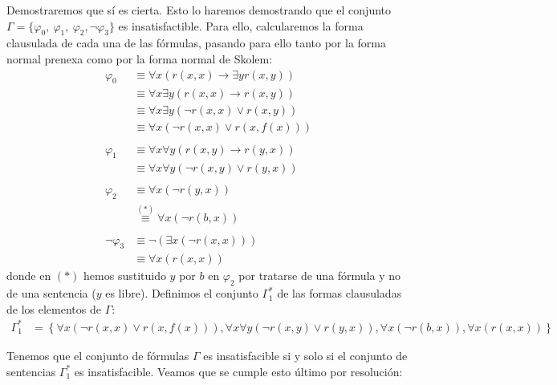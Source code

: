 \documentclass[12pt]{article}
\begin{document}
\begin{ejercicio}
\begin{enumerate}
            Demostraremos que sí es cierta. Esto lo haremos demostrando que el conjunto $\Gamma=\{\varphi_0,~\varphi_1,~\varphi_2, \lnot\varphi_3\}$ es insatisfactible.
            Para ello, calcularemos la forma clausulada de cada una de las fórmulas,
            pasando para ello tanto por la forma normal prenexa como por la forma normal de Skolem:
            \begin{align*}
                \varphi_0&\equiv \forall x (r(x, x) \rightarrow \exists y r(x, y))\\
                & \equiv \forall x \exists y (r(x, x) \rightarrow r(x, y))\\
                & \equiv \forall x \exists y (\lnot r(x, x) \lor r(x, y))\\
                & \equiv \forall x (\lnot r(x, x) \lor r(x, f(x)))\\ \\
                \varphi_1&\equiv \forall x \forall y (r(x, y) \rightarrow r(y, x))\\
                &\equiv \forall x \forall y (\lnot r(x, y) \lor r(y, x))\\ \\
                \varphi_2 &\equiv \forall x (\lnot r(y, x))\\
                &\stackrel{(\ast)}{\equiv} \forall x (\lnot r(b, x))\\ \\
                \lnot \varphi_3&\equiv \lnot (\exists x (\lnot r(x, x)))\\
                &\equiv \forall x (r(x, x))
            \end{align*}
            donde en $(\ast)$ hemos sustituido $y$ por $b$ en $\varphi_2$
            por tratarse de una fórmula y no de una sentencia ($y$ es libre).
            Definimos el conjunto $\Gamma_1^\ast$ de las formas clausuladas de los elementos de $\Gamma$:
            \begin{align*}
                \Gamma_1^\ast &=
                \left\{ \forall x (\lnot r(x, x) \lor r(x, f(x))),
                \forall x \forall y (\lnot r(x, y) \lor r(y, x)),
                \forall x (\lnot r(b, x)),
                \forall x (r(x, x))
                \right\}
            \end{align*}
    
            Tenemos que el conjunto de fórmulas $\Gamma$ es insatisfacible si y solo si el conjunto de sentencias $\Gamma_1^\ast$ es insatisfacible.
            Veamos que se cumple esto último por resolución:
            \begin{figure}[H]
                \centering
            \end{figure}
    

\end{enumerate}
\end{ejercicio}
\end{document}
